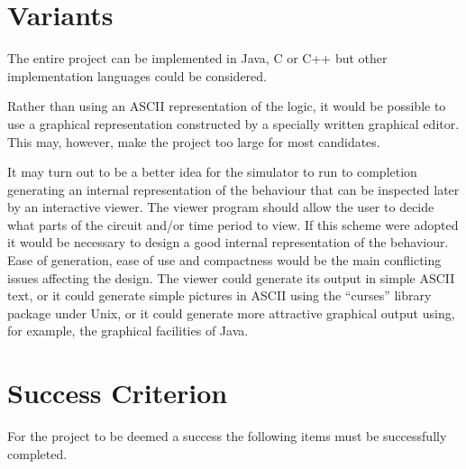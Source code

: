 \documentclass[12pt]{article}
\begin{document}
\section*{Variants}
 
The entire project can be implemented in Java, C or C++ but other
implementation languages could be considered.

Rather than using an ASCII representation of the logic, it would be
possible to use a graphical representation constructed by a specially
written graphical editor. This may, however, make the project
too large for most candidates.

It may turn out to be a better idea for the simulator to run to
completion generating an internal representation of the behaviour that
can be inspected later by an interactive viewer. The viewer program
should allow the user to decide what parts of the circuit and/or time
period to view.  If this scheme were adopted it would be necessary to
design a good internal representation of the behaviour. Ease of
generation, ease of use and compactness would be the main conflicting
issues affecting the design.  The viewer could generate its output in
simple ASCII text, or it could generate simple pictures in ASCII using
the ``curses'' library package under Unix, or it could generate more
attractive graphical output using, for example, the graphical
facilities of Java.


\section*{Success Criterion}

For the project to be deemed a success the following items must be
successfully completed.
\end{document}
